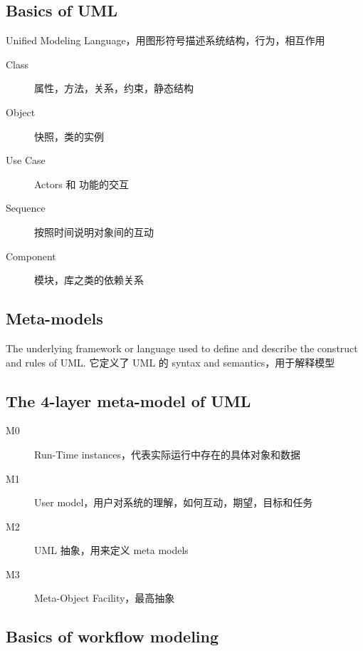 \documentclass[11pt,journal,compsoc]{IEEEtran}
\begin{document}
\subsection{Basics of UML}

Unified Modeling Language，用图形符号描述系统结构，行为，相互作用

\begin{description}
    \item[Class] 属性，方法，关系，约束，静态结构
    
    \item[Object] 快照，类的实例

    \item[Use Case] Actors 和 功能的交互

    \item[Sequence] 按照时间说明对象间的互动

    \item[Component] 模块，库之类的依赖关系
\end{description}


\subsection{Meta-models}

The underlying framework or language used to define and describe the construct and rules of UML. 它定义了 UML 的 syntax and semantics，用于解释模型


\subsection{The 4-layer meta-model of UML}

\begin{description}
    \item[M0] Run-Time instances，代表实际运行中存在的具体对象和数据

    \item[M1] User model，用户对系统的理解，如何互动，期望，目标和任务

    \item[M2] UML 抽象，用来定义 meta models

    \item[M3] Meta-Object Facility，最高抽象
\end{description}


\subsection{Basics of workflow modeling}
\end{document}
